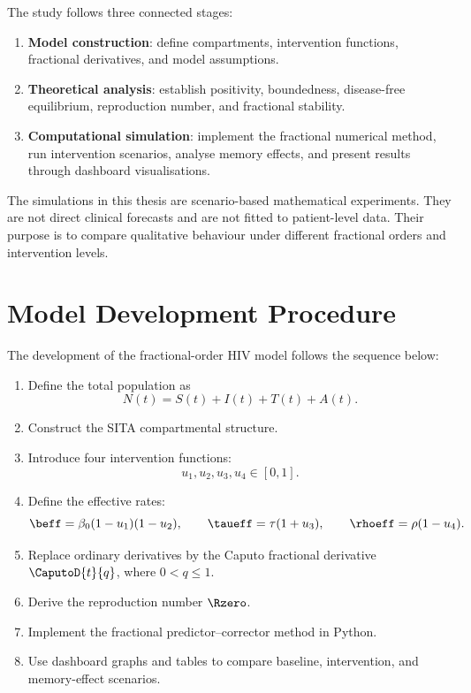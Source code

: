 The study follows three connected stages:
\begin{enumerate}
  \item \textbf{Model construction}: define compartments, intervention functions, fractional derivatives, and model assumptions.
  \item \textbf{Theoretical analysis}: establish positivity, boundedness, disease-free equilibrium, reproduction number, and fractional stability.
  \item \textbf{Computational simulation}: implement the fractional numerical method, run intervention scenarios, analyse memory effects, and present results through dashboard visualisations.
\end{enumerate}

\begin{remarkbox}[title={Nature of the results}]
The simulations in this thesis are scenario-based mathematical experiments. They are not direct clinical forecasts and are not fitted to patient-level data. Their purpose is to compare qualitative behaviour under different fractional orders and intervention levels.
\end{remarkbox}

\section{Model Development Procedure}

The development of the fractional-order HIV model follows the sequence below:
\begin{enumerate}
  \item Define the total population as
  \[
  N(t)=S(t)+I(t)+T(t)+A(t).
  \]
  \item Construct the SITA compartmental structure.
  \item Introduce four intervention functions:
  \[
  u_1,u_2,u_3,u_4\in[0,1].
  \]
  \item Define the effective rates:
  \[
  \beff=\beta_0(1-u_1)(1-u_2),\qquad
  \taueff=\tau(1+u_3),\qquad
  \rhoeff=\rho(1-u_4).
  \]
  \item Replace ordinary derivatives by the Caputo fractional derivative $\CaputoD{t}{q}$, where $0<q\leq1$.
  \item Derive the reproduction number $\Rzero$.
  \item Implement the fractional predictor--corrector method in Python.
  \item Use dashboard graphs and tables to compare baseline, intervention, and memory-effect scenarios.
\end{enumerate}

